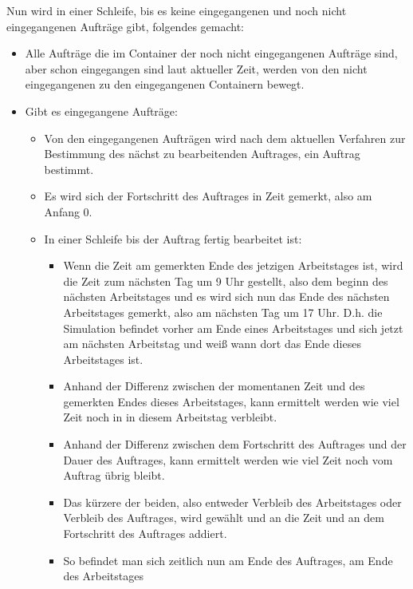\documentclass[a4paper,10pt,ngerman]{scrartcl}
\begin{document}
Nun wird in einer Schleife, bis es keine eingegangenen und noch nicht eingegangenen Aufträge gibt, folgendes gemacht:
\begin{itemize}
	\item Alle Aufträge die im Container der noch nicht eingegangenen Aufträge sind,
	      aber schon eingegangen sind laut aktueller Zeit,
    werden von den nicht eingegangenen zu den eingegangenen Containern bewegt.
	\item Gibt es eingegangene Aufträge:
	      \begin{itemize}
		      \item Von den eingegangenen Aufträgen wird nach dem aktuellen Verfahren
		            zur Bestimmung des nächst zu bearbeitenden Auftrages, ein Auftrag bestimmt.
		      \item Es wird sich der Fortschritt des Auftrages in Zeit gemerkt, also am Anfang 0.
		      \item In einer Schleife bis der Auftrag fertig bearbeitet ist:
		            \begin{itemize}
			            \item Wenn die Zeit am gemerkten Ende des jetzigen Arbeitstages ist,
                        wird die Zeit zum nächsten Tag um 9 Uhr gestellt,
			                  also dem beginn des nächsten Arbeitstages und
			                  es wird sich nun das Ende des nächsten Arbeitstages gemerkt,
                        also am nächsten Tag um 17 Uhr.
			                  D.h. die Simulation befindet vorher am Ende eines Arbeitstages
                        und sich jetzt am nächsten Arbeitstag
			                  und weiß wann dort das Ende dieses Arbeitstages ist.
			            \item Anhand der Differenz zwischen der momentanen Zeit
                        und des gemerkten Endes dieses Arbeitstages,
			                  kann ermittelt werden wie viel Zeit noch in in diesem Arbeitstag verbleibt.
			            \item Anhand der Differenz zwischen dem Fortschritt des Auftrages
			                  und der Dauer des Auftrages, kann ermittelt werden
                        wie viel Zeit noch vom Auftrag übrig bleibt.
			            \item Das kürzere der beiden, also entweder Verbleib des Arbeitstages
                         oder Verbleib des Auftrages,
			                  wird gewählt und an die Zeit und an dem Fortschritt des Auftrages addiert.
			            \item So befindet man sich zeitlich nun am Ende des Auftrages, am Ende des Arbeitstages

\end{itemize}
\end{itemize}
\end{itemize}
\end{document}
